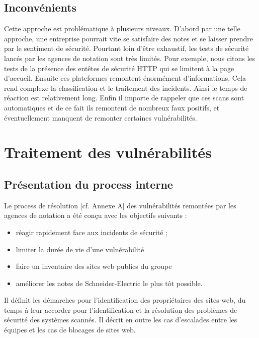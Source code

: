 \documentclass[a4paper,12pt]{book}
\theoremstyle{break}
\begin{document}
\subsection{Inconvénients}
Cette approche est problématique à plusieurs niveaux. D'abord par une telle approche, une entreprise pourrait vite se satisfaire des notes et se laisser prendre par le sentiment de sécurité. Pourtant loin d'être exhaustif, les tests de sécurité lancés par les agences de notation sont très limités. Pour exemple, nous citons les tests de la présence des entêtes de sécurité \ac{HTTP} qui se limitent à la page d'accueil.
\newline
Ensuite ces plateformes remontent énormément d'informations. Cela rend complexe la classification et le traitement des incidents. Ainsi  le temps de réaction est relativement long. \newline
Enfin il importe de rappeler que ces scans sont automatiques et de ce fait ils remontent de nombreux faux positifs, et éventuellement manquent de remonter certaines vulnérabilités. \section{Traitement des vulnérabilités}
\subsection{Présentation du process interne}
Le process de résolution [cf. Annexe A] des vulnérabilités remontées par les agences de notation a été conçu avec les objectifs suivants : 
\begin{itemize}
    \item réagir rapidement face aux incidents de sécurité ; 
    \item limiter la durée de vie d'une vulnérabilité
    \item faire un inventaire des sites web publics du groupe \item améliorer les notes de Schneider-Electric le plus tôt possible.
\end{itemize}
Il définit les démarches pour l’identification des propriétaires des sites web, du temps à leur accorder pour l’identification et la résolution des problèmes de sécurité des systèmes scannés. 
Il décrit en outre les cas d’escalades entre les équipes et les cas de blocages de sites web. 
\end{document}

